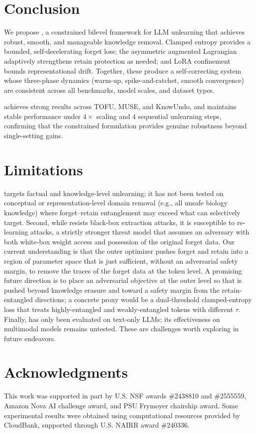 \section{Conclusion}
\label{sec:conclusion}

We propose \method, a constrained bilevel framework for LLM unlearning that achieves robust, smooth, and manageable knowledge removal.
Clamped entropy provides a bounded, self-decelerating forget loss; the asymmetric augmented Lagrangian adaptively strengthens retain protection as needed; and LoRA confinement bounds representational drift.
Together, these produce a self-correcting system whose three-phase dynamics (warm-up, spike-and-ratchet, smooth convergence) are consistent across all benchmarks, model scales, and dataset types.

\method achieves strong results across TOFU, MUSE, and KnowUndo, and maintains stable performance under $4\times$ scaling and 4 sequential unlearning steps, confirming that the constrained formulation provides genuine robustness beyond single-setting gains.

\section{Limitations}
\label{sec:limitations}
\method targets factual and knowledge-level unlearning; it has not been tested on conceptual or representation-level domain removal (e.g., all unsafe biology knowledge) where forget--retain entanglement may exceed what \method can selectively target.
Second, while \method resists black-box extraction attacks, it is susceptible to re-learning attacks, a strictly stronger threat model that assumes an adversary with both white-box weight access and possession of the original forget data.
Our current understanding is that the outer optimizer pushes forget and retain into a region of parameter space that is just sufficient, without an adversarial safety margin, to remove the traces of the forget data at the token level.
A promising future direction is to place an adversarial objective at the outer level so that \method is pushed beyond knowledge erasure and toward a safety margin from the retain-entangled directions; a concrete proxy would be a dual-threshold clamped-entropy loss that treats highly-entangled and weakly-entangled tokens with different $\tau$.
Finally, \method has only been evaluated on text-only LLMs; its effectiveness on multimodal models remains untested.
These are challenges worth exploring in future endeavors.

\section*{Acknowledgments}
This work was supported in part by U.S. NSF awards \#2438810 and \#2555559, Amazon Nova AI challenge award, and PSU Frymoyer chairship award. Some experimental results were obtained using computational resources provided by CloudBank, supported through U.S. NAIRR award \#240336.
